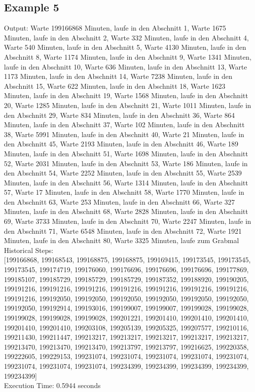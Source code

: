 \documentclass[a4paper,10pt,english]{scrartcl}
\begin{document}
\subsection*{Example 5}
Output: Warte 199166868 Minuten, laufe in den Abschnitt 1, Warte 1675 Minuten, laufe in den Abschnitt 2, Warte 332 Minuten, laufe in den Abschnitt 4, Warte 540 Minuten, laufe in den Abschnitt 5, Warte 4130 Minuten, laufe in den Abschnitt 8, Warte 1174 Minuten, laufe in den Abschnitt 9, Warte 1341 Minuten, laufe in den Abschnitt 10, Warte 636 Minuten, laufe in den Abschnitt 13, Warte 1173 Minuten, laufe in den Abschnitt 14, Warte 7238 Minuten, laufe in den Abschnitt 15, Warte 622 Minuten, laufe in den Abschnitt 18, Warte 1623 Minuten, laufe in den Abschnitt 19, Warte 1568 Minuten, laufe in den Abschnitt 20, Warte 1285 Minuten, laufe in den Abschnitt 21, Warte 1011 Minuten, laufe in den Abschnitt 29, Warte 834 Minuten, laufe in den Abschnitt 36, Warte 864 Minuten, laufe in den Abschnitt 37, Warte 102 Minuten, laufe in den Abschnitt 38, Warte 5991 Minuten, laufe in den Abschnitt 40, Warte 21 Minuten, laufe in den Abschnitt 45, Warte 2193 Minuten, laufe in den Abschnitt 46, Warte 189 Minuten, laufe in den Abschnitt 51, Warte 1698 Minuten, laufe in den Abschnitt 52, Warte 2031 Minuten, laufe in den Abschnitt 53, Warte 186 Minuten, laufe in den Abschnitt 54, Warte 2252 Minuten, laufe in den Abschnitt 55, Warte 2539 Minuten, laufe in den Abschnitt 56, Warte 1314 Minuten, laufe in den Abschnitt 57, Warte 17 Minuten, laufe in den Abschnitt 58, Warte 1770 Minuten, laufe in den Abschnitt 63, Warte 253 Minuten, laufe in den Abschnitt 66, Warte 327 Minuten, laufe in den Abschnitt 68, Warte 2828 Minuten, laufe in den Abschnitt 69, Warte 3733 Minuten, laufe in den Abschnitt 70, Warte 2247 Minuten, laufe in den Abschnitt 71, Warte 6548 Minuten, laufe in den Abschnitt 72, Warte 1921 Minuten, laufe in den Abschnitt 80, Warte 3325 Minuten, laufe zum Grabmal\\
Historical Steps:\\
{[199166868, 199168543, 199168875, 199168875, 199169415, 199173545, 199173545, 199173545, 199174719, 199176060, 199176696, 199176696, 199176696, 199177869, 199185107, 199185729, 199185729, 199185729, 199187352, 199188920, 199190205, 199191216, 199191216, 199191216, 199191216, 199191216, 199191216, 199191216, 199191216, 199192050, 199192050, 199192050, 199192050, 199192050, 199192050, 199192050, 199192914, 199193016, 199199007, 199199007, 199199028, 199199028, 199199028, 199199028, 199199028, 199201221, 199201410, 199201410, 199201410, 199201410, 199201410, 199203108, 199205139, 199205325, 199207577, 199210116, 199211430, 199211447, 199213217, 199213217, 199213217, 199213217, 199213217, 199213470, 199213470, 199213470, 199213797, 199213797, 199216625, 199220358, 199222605, 199229153, 199231074, 199231074, 199231074, 199231074, 199231074, 199231074, 199231074, 199231074, 199234399, 199234399, 199234399, 199234399, 199234399]
}\\
Execution Time: 0.5944 seconds
\end{document}
